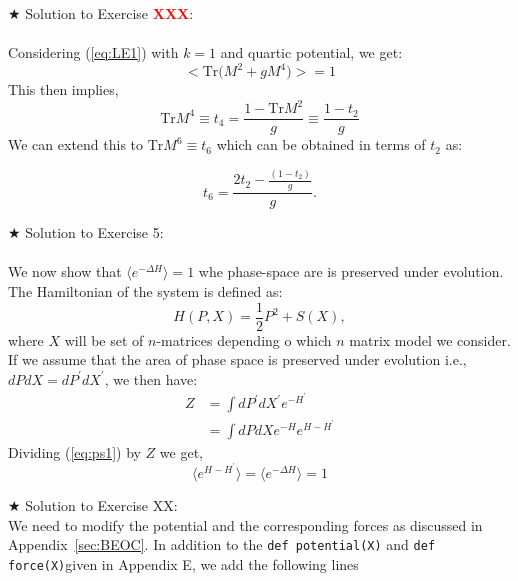 \documentclass[11pt]{article}
\newcommand{\TODO}[1]{\textcolor{red}{{\bf #1}}}
\begin{document}
\noindent $\bigstar$ Solution to Exercise \TODO{XXX}:
\\ \\ Considering (\ref{eq:LE1}) with $k=1$ and quartic potential, we get: 
    \begin{equation}
    \Big< \mathrm{Tr}\Big(M^{2} + g M^{4}\Big) \Big> = 1 
    \end{equation}
    This then implies, 
     \begin{equation}
     \mathrm{Tr} M^{4} \equiv t_{4} = \frac{1 - \mathrm{Tr} M^{2}}{g} \equiv \frac{1 - t_2}{g} 
     \end{equation}
     We can extend this to $\mathrm{Tr} M^{6} \equiv t_{6}$ which can be obtained in terms of 
     $t_2$ as:  
     
     \begin{equation}
     	t_{6} = \frac{2t_{2} - \frac{(1-t_{2})}{g}}{g}. 
     \end{equation} 

\noindent $\bigstar$ Solution to Exercise 5:
\\ \\ We now show that $ \langle e^{-\Delta H} \rangle = 1$ whe phase-space are is preserved under evolution. The Hamiltonian of the system is defined as:
\begin{equation}
	H(P,X) = \frac{1}{2}P^2  + S(X), 
\end{equation} 
where $X$ will be set of $n$-matrices depending o which $n$ matrix model we consider. If we assume that the area of phase space is preserved under evolution i.e., $dP dX = dP^{\prime} dX^{\prime}$, we then have:
\begin{align}
	\label{eq:ps1} 
	Z &= \int dP^{\prime} dX^{\prime} e^{-H^{\prime} \nonumber }  \\
	&=  \int dP dX e^{-H} e^{H-H^{\prime}}
\end{align}
Dividing (\ref{eq:ps1}) by $Z$ we get, 
\begin{equation}
	\langle e^{H-H^{\prime}} \rangle = 	\langle e^{-\Delta H} \rangle = 1
\end{equation}

\noindent $\bigstar$ Solution to Exercise XX:
\\  
We need to modify the potential and the corresponding forces as discussed in Appendix~\ref{sec:BEOC}. In addition to the \verb"def potential(X)" 
and \verb"def force(X)"given in Appendix E, we add the following lines 
\end{document}
